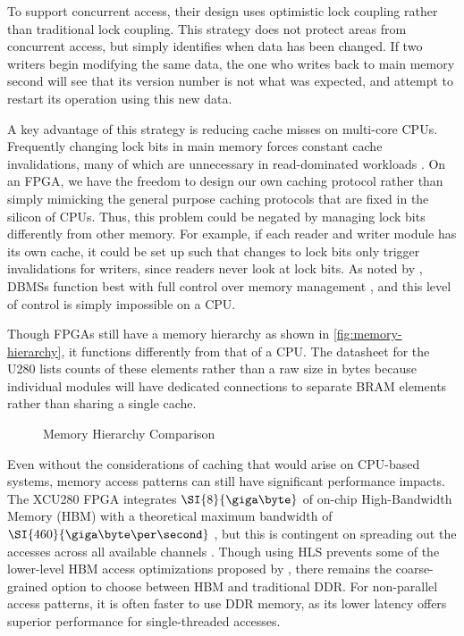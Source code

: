 To support concurrent access, their design uses optimistic lock coupling rather
than traditional lock coupling. This strategy does not protect areas from
concurrent access, but simply identifies when data has been changed. If two
writers begin modifying the same data, the one who writes back to main memory
second will see that its version number is not what was expected, and attempt to
restart its operation using this new data.

A key advantage of this strategy is reducing cache misses on multi-core CPUs.
Frequently changing lock bits in main memory forces constant cache
invalidations, many of which are unnecessary in read-dominated workloads
\autocite{leis-damon-2016}. On an FPGA, we have the freedom to design our own
caching protocol rather than simply mimicking the general purpose caching
protocols that are fixed in the silicon of CPUs. Thus, this problem could be
negated by managing lock bits differently from other memory.
%
For example, if each reader and writer module has its own cache, it could be set
up such that changes to lock bits only trigger invalidations for writers, since
readers never look at lock bits. As noted by \citeauthor{binnig-vldb-2016},
DBMSs function best with full control over memory management
\autocite{binnig-vldb-2016}, and this level of control is simply impossible on a
CPU.


\label{subsec:memory-layout}

Though FPGAs still have a memory hierarchy as shown in
\autoref{fig:memory-hierarchy}, it functions differently from that of a CPU. The
datasheet for the U280 lists counts of these elements rather than a raw size in
bytes because individual modules will have dedicated connections to separate
BRAM elements rather than sharing a single cache.

\begin{figure}[H]
	\centering
	
	\caption{Memory Hierarchy Comparison}
	\label{fig:memory-hierarchy}
\end{figure}

Even without the considerations of caching that would arise on CPU-based
systems, memory access patterns can still have significant performance impacts.
The XCU280 FPGA integrates $\SI{8}{\giga\byte}$ of on-chip High-Bandwidth Memory
(HBM) with a theoretical maximum bandwidth of $\SI{460}{\giga\byte\per\second}$
\autocite{u280}, but this is contingent on spreading out the accesses across all
available channels \autocite{holzinger-ipdpsw-2021}.
%
Though using HLS prevents some of the lower-level HBM access optimizations
proposed by \citeauthor{holzinger-ipdpsw-2021} \autocite{holzinger-ipdpsw-2021},
there remains the coarse-grained option to choose between HBM and traditional
DDR. For non-parallel access patterns, it is often faster to use DDR memory, as
its lower latency offers superior performance for single-threaded accesses.

